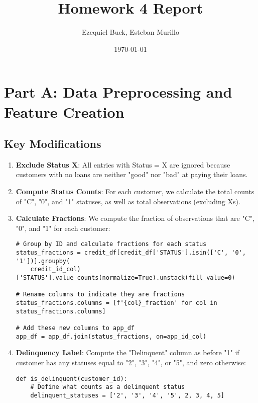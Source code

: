 \documentclass[12pt]{article}
\title{Homework 4 Report}
\author{Ezequiel Buck, Esteban Murillo}
\date{\today}
\begin{document}
\maketitle

\section{Part A: Data Preprocessing and Feature Creation}

\subsection{Key Modifications}

\begin{enumerate}
    \item \textbf{Exclude Status X}: All entries with Status = X are ignored because customers with no loans are neither "good" nor "bad" at paying their loans.
    
    \item \textbf{Compute Status Counts}: For each customer, we calculate the total counts of "C", "0", and "1" statuses, as well as total observations (excluding Xs).
    
    \item \textbf{Calculate Fractions}: We compute the fraction of observations that are "C", "0", and "1" for each customer:
    
\begin{verbatim}
# Group by ID and calculate fractions for each status
status_fractions = credit_df[credit_df['STATUS'].isin(['C', '0', '1'])].groupby(
    credit_id_col)['STATUS'].value_counts(normalize=True).unstack(fill_value=0)

# Rename columns to indicate they are fractions
status_fractions.columns = [f'{col}_fraction' for col in status_fractions.columns]

# Add these new columns to app_df
app_df = app_df.join(status_fractions, on=app_id_col)
\end{verbatim}

    \item \textbf{Delinquency Label}: Compute the "Delinquent" column as before "1" if customer has any statuses equal to "2", "3", "4", or "5", and zero otherwise:
    
\begin{verbatim}
def is_delinquent(customer_id):
    # Define what counts as a delinquent status
    delinquent_statuses = ['2', '3', '4', '5', 2, 3, 4, 5]
    

\end{verbatim}
\end{enumerate}
\end{document}
